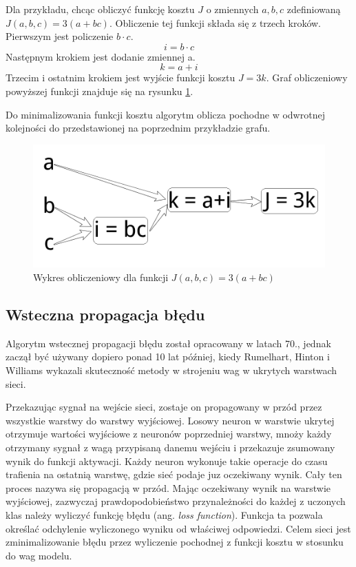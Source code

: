 \documentclass[12pt,a4paper,twoside,titlepage,openright]{book}
\begin{document}
Dla przykładu, chcąc obliczyć funkcję kosztu \(J\) o zmiennych \(a,b,c\) zdefiniowaną \(J(a,b,c) = 3(a+bc)\). Obliczenie tej funkcji składa się z trzech kroków. Pierwszym jest policzenie \(b \cdot c\).
$$i = b \cdot c$$
Następnym krokiem jest dodanie zmiennej a.
$$k = a + i$$
Trzecim i ostatnim krokiem jest wyjście funkcji kosztu \(J = 3k\).
Graf obliczeniowy powyższej funkcji znajduje się na rysunku \ref{fig:costFunction}.

Do minimalizowania funkcji kosztu algorytm oblicza pochodne w odwrotnej kolejności do przedstawionej na poprzednim przykładzie grafu.

\begin{figure}[ht]
	\centering
			\includegraphics[resolution=100, scale=0.4]{ComputationGraph.png}
		\caption{Wykres obliczeniowy dla funkcji \(J(a,b,c) = 3(a+bc)\)}
				\label{fig:costFunction}
\end{figure}

\subsection{Wsteczna propagacja błędu}
Algorytm wstecznej propagacji błędu został opracowany w latach 70., jednak zaczął być używany dopiero ponad 10 lat później, kiedy Rumelhart, Hinton i Williams wykazali skuteczność metody w strojeniu wag w ukrytych warstwach sieci.

Przekazując sygnał na wejście sieci, zostaje on propagowany w przód przez wszystkie warstwy do warstwy wyjściowej. Losowy neuron w warstwie ukrytej otrzymuje wartości wyjściowe z neuronów poprzedniej warstwy, mnoży każdy otrzymany sygnał z wagą przypisaną danemu wejściu i przekazuje zsumowany wynik do funkcji aktywacji. Każdy neuron wykonuje takie operacje do czasu trafienia na ostatnią warstwę, gdzie sieć podaje juz oczekiwany wynik. Cały ten proces nazywa się propagacją w przód. Mając oczekiwany wynik na warstwie wyjściowej, zazwyczaj prawdopodobieństwo przynależności do każdej z uczonych klas należy wyliczyć funkcję błędu (ang. \textit{loss function}). Funkcja ta pozwala określać odchylenie wyliczonego wyniku od właściwej odpowiedzi. Celem sieci jest zminimalizowanie błędu przez wyliczenie pochodnej z funkcji kosztu w stosunku do wag modelu.
\end{document}
